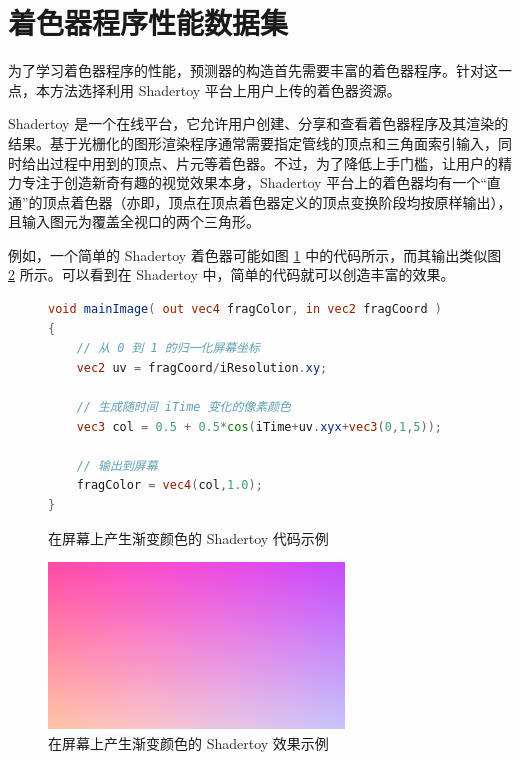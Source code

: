 \section{着色器程序性能数据集}

\label{sec:dataset}

为了学习着色器程序的性能，预测器的构造首先需要丰富的着色器程序。针对这一点，本方法选择利用 Shadertoy \cite{Shadertoy} 平台上用户上传的着色器资源。

Shadertoy 是一个在线平台，它允许用户创建、分享和查看着色器程序及其渲染的结果。基于光栅化的图形渲染程序通常需要指定管线的顶点和三角面索引输入，同时给出过程中用到的顶点、片元等着色器。不过，为了降低上手门槛，让用户的精力专注于创造新奇有趣的视觉效果本身，Shadertoy 平台上的着色器均有一个“直通”的顶点着色器（亦即，顶点在顶点着色器定义的顶点变换阶段均按原样输出），且输入图元为覆盖全视口的两个三角形。

例如，一个简单的 Shadertoy 着色器可能如图 \ref{fig:example_glsl_shadertoy_code} 中的代码所示，而其输出类似图 \ref{fig:example_shadertoy_output} 所示。可以看到在 Shadertoy 中，简单的代码就可以创造丰富的效果。

\begin{figure}  %
\centering

\begin{lstlisting}[language=GLSL]
void mainImage( out vec4 fragColor, in vec2 fragCoord )
{
    // 从 0 到 1 的归一化屏幕坐标
    vec2 uv = fragCoord/iResolution.xy;

    // 生成随时间 iTime 变化的像素颜色
    vec3 col = 0.5 + 0.5*cos(iTime+uv.xyx+vec3(0,1,5));

    // 输出到屏幕
    fragColor = vec4(col,1.0);
}
\end{lstlisting}
\caption{在屏幕上产生渐变颜色的 Shadertoy 代码示例}
\label{fig:example_glsl_shadertoy_code}
\end{figure}

\begin{figure}
\centering
\includegraphics[width=0.7\textwidth]{figures/example_shadertoy_output.png}
\caption{在屏幕上产生渐变颜色的 Shadertoy 效果示例}
\label{fig:example_shadertoy_output}
\end{figure}

